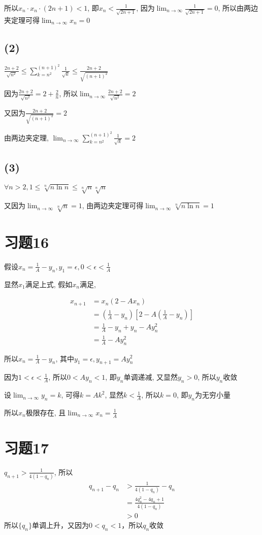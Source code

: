 \documentclass[a4paper,11pt]{article}
\newcommand{\Limit}{\displaystyle \lim_{n \rightarrow \infty}}
\begin{document}
所以$x_n \cdot x_n \cdot (2n+1) < 1$, 即$x_n < \frac{1}{\sqrt{2n+1}}$, 因为$\Limit \frac{1}{\sqrt{2n+1}} = 0$, 所以由两边夹定理可得$\Limit x_n = 0$
\subsection*{(2)}
$\displaystyle \frac{2n+2}{\sqrt{n^2}} \le \sum_{k=n^2}^{(n+1)^2} \frac{1}{\sqrt{k}} \le \frac{2n+2}{\sqrt{(n+1)^2}}$

因为$\frac{2n+2}{\sqrt{n^2}} = 2+\frac{2}{n}$, 所以$\Limit \frac{2n+2}{\sqrt{n^2}} = 2$

又因为$\frac{2n+2}{\sqrt{(n+1)^2}} = 2$

由两边夹定理, $\Limit \sum_{k=n^2}^{(n+1)^2} \frac{1}{\sqrt{k}} = 2$
\subsection*{(3)}
$\forall n > 2, 1 \le \sqrt[n]{n\ln n} \le \sqrt[n]{n}\sqrt[n]{n}$

又因为$\Limit \sqrt[n]{n} = 1$, 由两边夹定理可得$\Limit \sqrt[n]{n \ln n} = 1$
\section*{习题16}
假设$x_n = \frac{1}{A} - y_n, y_1 = \epsilon, 0 < \epsilon < \frac{1}{A}$

显然$x_1$满足上式, 假如$x_n$满足, 

\begin{align*}
	x_{n+1} &= x_n(2-Ax_n)\\
		     &= (\frac{1}{A} - y_n)[2-A(\frac{1}{A}-y_n)]\\
		     &=\frac{1}{A} - y_n + y_n - Ay_n^2\\
	&=\frac{1}{A} - Ay_n^2
\end{align*}

所以$x_n = \frac{1}{A} - y_n$, 其中$y_1 = \epsilon, y_{n+1} = Ay_n^2$

因为$1 < \epsilon <\frac{1}{A}$, 所以$0 < Ay_n < 1$, 即$y_n$单调递减, 又显然$y_n > 0$, 所以$y_n$收敛

设$\Limit y_n = k$, 可得$k = Ak^2$, 显然$k < \frac{1}{A}$, 所以$k=0$, 即$y_n$为无穷小量

所以$x_n$极限存在, 且$\Limit x_n = \frac{1}{A}$
\section*{习题17}
$q_{n+1} > \frac{1}{4(1-q_n)}$, 所以
\begin{align*}
	q_{n+1}-q_n &> \frac{1}{4(1-q_n)} - q_n\\
								&=\frac{4q_n^2-4q_n+1}{4(1-q_n)}\\
		 &>0
\end{align*}
所以$\{q_n\}$单调上升，又因为$0 < q_n < 1$，所以${q_n}$收敛
\end{document}
